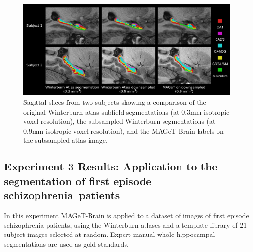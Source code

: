 \documentclass{article}\usepackage{graphicx, color}
\newcommand{\mb}{MAGeT-Brain }
\begin{document}
\begin{figure}
  \begin{centering}
    \includegraphics[width=6in]{figure/subfield-montage.pdf}
  \end{centering}
  \caption{Sagittal slices from two subjects showing a comparison of the
  original Winterburn atlas subfield segmentations (at 0.3mm-isotropic voxel
  resolution), the subsampled Winterburn segmentations (at 0.9mm-isotropic
  voxel resolution), and the \mb labels on the subsampled atlas image.}
  \label{fig:subfield-montage}
\end{figure}


\FloatBarrier
\subsection{Experiment 3 Results: Application to the segmentation of first episode
\\ \mbox{schizophrenia patients}}
 
In this experiment \mb is applied to a dataset of images of first episode
schizophrenia patients, using the Winterburn atlases and a template library of
21 subject images selected at random.  Expert manual whole hippocampal
segmentations are used as gold standards. 
\end{document}
